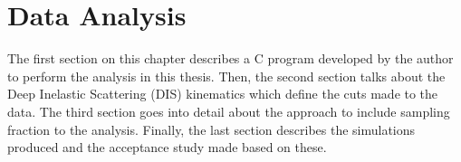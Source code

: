 \section{Data Analysis} \label{sec::dataanalysis}
    The first section on this chapter describes a C program developed by the author to perform the analysis in this thesis.
    Then, the second section talks about the Deep Inelastic Scattering (DIS) kinematics which define the cuts made to the data.
    The third section goes into detail about the approach to include sampling fraction to the analysis.
    Finally, the last section describes the simulations produced and the acceptance study made based on these.

    
    
    
    

